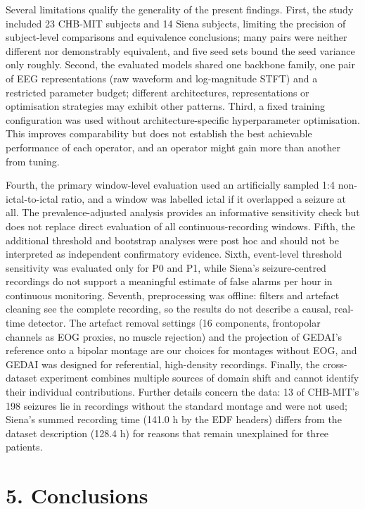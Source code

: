 \documentclass[11pt,a4paper]{article}
\begin{document}
\endgroup

Several limitations qualify the generality of the present findings. First, the study
included 23 CHB-MIT subjects and 14 Siena subjects, limiting the precision of
subject-level comparisons and equivalence conclusions; many pairs were neither different
nor demonstrably equivalent, and five seed sets bound the seed variance only roughly.
Second, the evaluated models shared one backbone family, one pair of EEG representations
(raw waveform and log-magnitude STFT) and a restricted parameter budget; different
architectures, representations or optimisation strategies may exhibit other patterns.
Third, a fixed training configuration was used without architecture-specific
hyperparameter optimisation. This improves comparability but does not establish the best
achievable performance of each operator, and an operator might gain more than another
from tuning.

Fourth, the primary window-level evaluation used an artificially sampled 1:4
non-ictal-to-ictal ratio, and a window was labelled ictal if it overlapped a seizure at
all. The prevalence-adjusted analysis provides an informative sensitivity check but does
not replace direct evaluation of all continuous-recording windows. Fifth, the additional
threshold and bootstrap analyses were post hoc and should not be interpreted as
independent confirmatory evidence. Sixth, event-level threshold sensitivity was
evaluated only for P0 and P1, while Siena's seizure-centred recordings do not support a
meaningful estimate of false alarms per hour in continuous monitoring. Seventh,
preprocessing was offline: filters and artefact cleaning see the complete recording, so
the results do not describe a causal, real-time detector. The artefact removal settings
(16 components, frontopolar channels as EOG proxies, no muscle rejection) and the
projection of GEDAI's reference onto a bipolar montage are our choices for montages
without EOG, and GEDAI was designed for referential, high-density recordings. Finally,
the cross-dataset experiment combines multiple sources of domain shift and cannot
identify their individual contributions. Further details concern the data: 13 of
CHB-MIT's 198 seizures lie in recordings without the standard montage and were not used;
Siena's summed recording time (141.0 h by the EDF headers) differs from the dataset
description (128.4 h) for reasons that remain unexplained for three patients.

\section{5. Conclusions}\label{conclusions}
\end{document}
